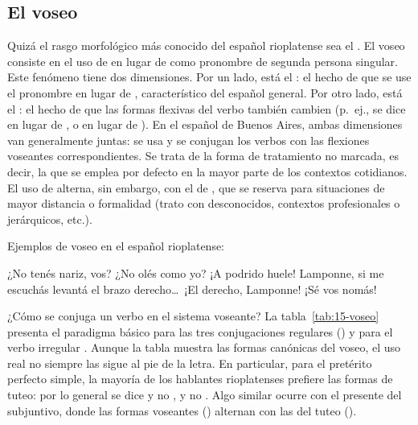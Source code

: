 \subsection{El voseo}\label{sec:15-voseo}

Quizá el rasgo morfológico más conocido del español rioplatense sea el
. El voseo consiste en el uso de  en lugar de
 como pronombre de segunda persona singular. Este fenómeno tiene dos
dimensiones. Por un lado, está el : el hecho de que se
use el pronombre  en lugar de , característico del español
general. Por otro lado, está el : el hecho de que las
formas flexivas del verbo también cambien (p.~ej., se dice  en lugar
de , o  en lugar de ). En el español de
Buenos Aires, ambas dimensiones van generalmente juntas: se usa  y se
conjugan los verbos con las flexiones voseantes correspondientes. Se trata de la
forma de tratamiento no marcada, es decir, la que se emplea por defecto en la
mayor parte de los contextos cotidianos. El uso de  alterna, sin
embargo, con el de , que se reserva para situaciones de mayor
distancia o formalidad (trato con desconocidos, contextos profesionales o
jerárquicos, etc.).

\begin{exe}
  \ex\label{ex:15-voseo} Ejemplos de voseo en el español rioplatense:
    \begin{xlist}
      \ex ¿No tenés nariz, vos? ¿No olés como yo? ¡A podrido huele!
      \ex Lamponne, si me escuchás levantá el brazo derecho\ldots\ ¡El derecho,
          Lamponne!
      \ex ¡Sé vos nomás!
    \end{xlist}
\end{exe}

¿Cómo se conjuga un verbo en el sistema voseante? La
tabla~\ref{tab:15-voseo} presenta el paradigma básico para las tres
conjugaciones regulares () y para el verbo irregular
. Aunque la tabla muestra las formas canónicas del voseo, el uso real
no siempre las sigue al pie de la letra. En particular, para el pretérito
perfecto simple, la mayoría de los hablantes rioplatenses prefiere las formas de
tuteo: por lo general se dice  y no ,
 y no . Algo similar ocurre con el presente del
subjuntivo, donde las formas voseantes () alternan con las
del tuteo ().

